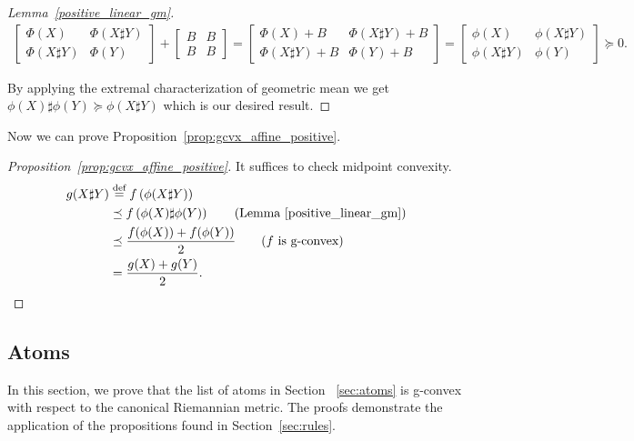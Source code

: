 \documentclass[twoside,11pt]{article}
\begin{document}
\begin{proof}[Lemma~\ref{positive_linear_gm}]
         \begin{equation}
        \begin{aligned}
\begin{bmatrix}
            \Phi(X)  & \Phi\left(X \sharp Y\right)  
            \\ \Phi\left(X\sharp Y\right)   &\Phi(Y) 
        \end{bmatrix} 
        + 
        \begin{bmatrix}
            B & B \\
            B & B
        \end{bmatrix}
        =
        \begin{bmatrix}
            \Phi(X)+ B &\Phi\left(X \sharp Y\right)   + B \\
            \Phi\left(X\sharp Y\right)+ B & \Phi(Y) + B
        \end{bmatrix}
        = \begin{bmatrix}
            \phi(X)  & \phi\left(X \sharp Y\right)  
            \\ \phi\left(X\sharp Y\right)   &\phi(Y) 
        \end{bmatrix} 
        \succeq 0 .
        \end{aligned}
    \end{equation}

 By applying the extremal characterization of geometric mean we get $\phi(X) \sharp \phi(Y) \succeq \phi(X \sharp Y)$ which is our desired result.
\end{proof}



Now we can prove Proposition~\ref{prop:gcvx_affine_positive}.

\begin{proof}[Proposition~\ref{prop:gcvx_affine_positive}]
    It suffices to check midpoint convexity. 
    \[
    \begin{aligned}
        g(X \sharp Y) &\stackrel{\text{def}}{=} f\left(\phi(X\sharp Y) \right) 
        \\& \preceq f \left( \phi(X)  \sharp \phi(Y) \right) \qquad (\text{Lemma~\ref{positive_linear_gm})}
        \\& \preceq \frac{f(\phi(X)) + f(\phi(Y))}{2} \qquad (f \text{ is g-convex})
        \\& = \frac{g(X) + g(Y)}{2}.
    \end{aligned}
    \]
\end{proof}


\subsection{Atoms}\label{app:gcvx_atoms}
In this section, we prove that the list of atoms in Section ~\ref{sec:atoms} is g-convex with respect to the canonical Riemannian metric. The proofs demonstrate the application of the propositions found in Section~\ref{sec:rules}. 
\end{document}
